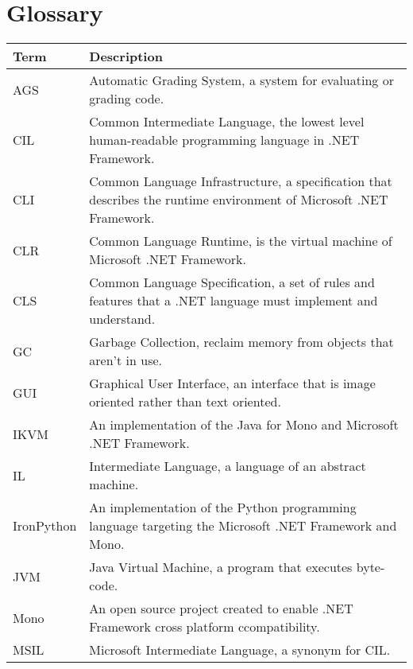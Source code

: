 \chapter*{Glossary}

\begin{center}
	\begin{tabular} { m{3cm} | m{11cm} }
		\hline
		\textbf{Term}	& \textbf{Description} \\ \hline
		AGS				& Automatic Grading System, a system for evaluating or grading code. \\ \hline
		CIL				& Common Intermediate Language, the lowest level human-readable programming language in .NET Framework. \\ \hline
		CLI				& Common Language Infrastructure, a specification that describes the runtime environment of Microsoft .NET Framework. \\ \hline
		CLR				& Common Language Runtime, is the virtual machine of Microsoft .NET Framework. \\ \hline
		CLS				& Common Language Specification, a set of rules and features that a .NET language must implement and understand. \\ \hline
		GC 				& Garbage Collection, reclaim memory from objects that aren't in use. \\ \hline
		GUI				& Graphical User Interface, an interface that is image oriented rather than text oriented. \\ \hline
		IKVM			& An implementation of the Java for Mono and Microsoft .NET Framework. \\ \hline
		IL				& Intermediate Language, a language of an abstract machine. \\ \hline
		IronPython		& An implementation of the Python programming language targeting the Microsoft .NET Framework and Mono. \\ \hline
		JVM				& Java Virtual Machine, a program that executes byte-code. \\ \hline
		Mono			& An open source project created to enable .NET Framework cross platform ccompatibility. \\ \hline
		MSIL			& Microsoft Intermediate Language, a synonym for CIL. \\ \hline
	\end{tabular}
\end{center}

